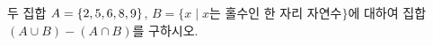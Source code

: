 두 집합 $A=\{2{,}\mkern3mu\mathopen{}5{,}\mkern3mu\mathopen{}6{,}\mkern3mu\mathopen{}8{,}\mkern3mu\mathopen{}9\}$, $B=\{x \mid x$는 홀수인 한 자리 자연수$\}$에 대하여 집합 $(A\cup B)-(A\cap B)$를 구하시오.
